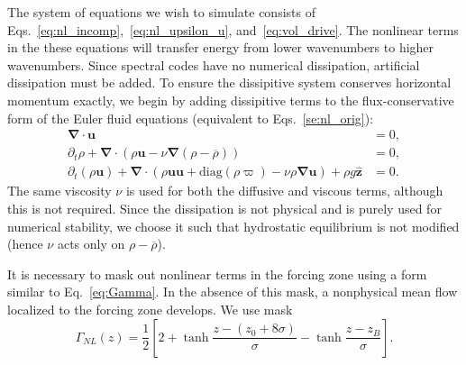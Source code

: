 \documentclass[
        fleqn,
        usenatbib,
        referee,
    ]{mnras}
\newcommand*{\pd}[2]{\frac{\partial#1}{\partial#2}}
\newcommand*{\p}[1]{\left(#1\right)}
\newcommand*{\s}[1]{\left[#1\right]}
\newcommand*{\bm}[1]{\mathbf{#1}}
\newcommand*{\uv}[1]{\hat{\mathbf{#1}}}
\begin{document}
The system of equations we wish to simulate consists of
Eqs.~\eqref{eq:nl_incomp},~\eqref{eq:nl_upsilon_u}, and~\eqref{eq:vol_drive}.
The nonlinear terms in the these equations will transfer energy from lower
wavenumbers to higher wavenumbers. Since spectral codes have no numerical
dissipation, artificial dissipation must be added. To ensure the dissipitive
system conserves horizontal momentum exactly, we begin by adding dissipitive
terms to the flux-conservative form of the Euler fluid equations
(equivalent to Eqs.~\ref{se:nl_orig}):
\begin{subequations}
    \begin{align}
        \bm{\nabla} \cdot \bm{u} &= 0,\\
        \partial_t \rho + \bm{\nabla} \cdot (\rho \bm{u} - \nu
            \bm{\nabla}(\rho - \overline{\rho})) &= 0,\label{eq:visc_cons_mom}\\
        \partial_t (\rho \bm{u}) + \bm{\nabla} \cdot (\rho \bm{u} \bm{u}
            + \mathrm{diag}(\rho \varpi)
            - \nu \rho \bm{\nabla}\bm{u})
            + \rho g \uv{z} &= 0.
    \end{align}
\end{subequations}
The same viscosity $\nu$ is used for both the diffusive and viscous terms,
although this is not required. Since the dissipation is not physical and is
purely used for numerical stability, we choose it such that hydrostatic
equilibrium is not modified (hence $\nu$ acts only on $\rho - \overline{\rho}$).

It is necessary to mask out nonlinear terms in the forcing zone using a form
similar to Eq.~\eqref{eq:Gamma}. In the absence of this mask, a nonphysical mean
flow localized to the forcing zone develops. We use mask
\begin{equation}
    \Gamma_{NL}(z) = \frac{1}{2}\s{2
        + \tanh \frac{z - (z_0 + 8\sigma)}{\sigma}
        - \tanh \frac{z - z_B}{\sigma}}.
\end{equation}
\end{document}
